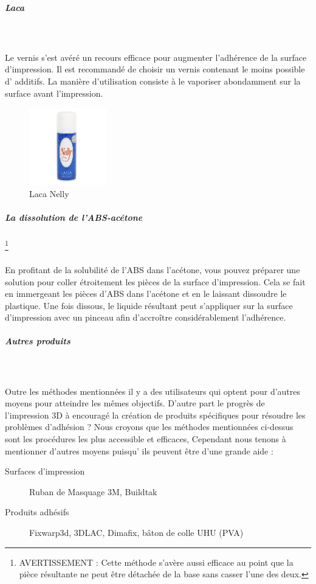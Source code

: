 \documentclass[11pt,a4paper]{article}
\begin{document}
				\subparagraph{Laca}\mbox{}\\\\
Le vernis s’est avéré un recours efficace pour augmenter l’adhérence de la surface d’impression. Il est recommandé de choisir un vernis contenant le moins possible d’ additifs. La manière d’utilisation consiste à le vaporiser abondamment sur la surface avant l’impression.
\begin{figure}[H]
\centering
\includegraphics[width=0.3\textwidth,cfbox=azul_marcos 4pt 0pt]{FOTOS/LACA}
\caption*{Laca Nelly}
\end{figure}
				\subparagraph{La dissolution de l’ABS-acétone}\footnote{AVERTISSEMENT : Cette méthode s’avère aussi efficace au point que la pièce résultante ne peut être détachée de la base sans casser l’une des deux. } \mbox{}\\\\
En profitant de la solubilité de l'ABS dans l'acétone, vous pouvez préparer une solution pour coller étroitement les pièces de la surface d'impression. Cela se fait en immergeant les pièces d'ABS dans l'acétone et en le laissant dissoudre le plastique. Une fois dissous, le liquide résultant peut s’appliquer sur la surface d’impression avec un pinceau afin d’accroître considérablement l’adhérence.
				\subparagraph{Autres produits}\mbox{}\\\\
Outre les méthodes mentionnées il y a des utilisateurs qui optent pour d’autres moyens pour atteindre les mêmes objectifs. D'autre part  le progrès de l’impression 3D à encouragé la création de produits spécifiques pour résoudre les problèmes d’adhésion ? Nous croyons que les méthodes mentionnées ci-dessus sont les procédures les plus accessible et efficaces, Cependant nous tenons à mentionner d’autres moyens puisqu’ ils peuvent être d’une grande aide :
\begin{description}
\item[Surfaces d’impression] Ruban de Masquage 3M, Buildtak
\item[Produits adhésifs] Fixwarp3d, 3DLAC, Dimafix, bâton de colle UHU (PVA)
\end{description}
\end{document}
